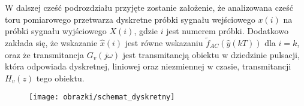 W dalszej cześć podrozdziału przyjęte zostanie założenie, że analizowana cześć toru pomiarowego przetwarza dyskretne próbki sygnału wejściowego $x(i)$ na próbki sygnału wyjściowego $X(i)$, gdzie $i$ jest numerem próbki. Dodatkowo zakłada się, że wskazanie $\hat{x}(i)$ jest równe wskazaniu $\tilde{f}_{AC}(\hat{y}(kT))$ dla $i = k$, oraz że transmitancja $G_{v}(j\omega)$ jest transmitancją obiektu w dziedzinie pulsacji, która odpowiada dyskretnej, liniowej oraz niezmiennej w czasie, transmitancji $H_{v}(z)$ tego obiektu.

\begin{figure}[htb!]
\begin{center}
\texttt{[image: obrazki/schemat\_dyskretny]}
\end{center}
\end{figure}


